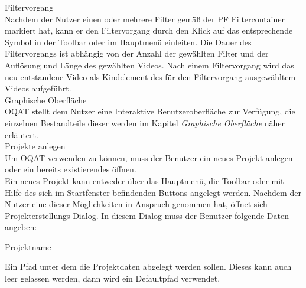  Filtervorgang\\
Nachdem der Nutzer einen oder mehrere Filter gemäß der PF Filtercontainer markiert hat, kann er
den Filtervorgang durch den Klick auf das entsprechende Symbol in der Toolbar oder im Hauptmenü
einleiten. Die Dauer des Filtervorgangs ist abhängig von der Anzahl der gewählten Filter und der Auflösung
und Länge des gewählten Videos. Nach einem Filtervorgang wird das neu entstandene Video
als Kindelement des für den Filtervorgang ausgewähltem Videos aufgeführt.\\
 Graphische Oberfläche \\
\gls{OQAT} stellt dem Nutzer eine Interaktive Benutzeroberfläche zur Verfügung, die
einzelnen Bestandteile dieser werden im Kapitel \emph{Graphische Oberfläche} näher erläutert.\\
 Projekte anlegen \\
Um \gls{OQAT} verwenden zu können, muss der Benutzer ein neues Projekt anlegen oder
ein bereits existierendes öffnen. \\
Ein neues Projekt kann entweder über das Hauptmenü, die Toolbar oder mit Hilfe des sich
im Startfenster befindenden Buttons angelegt werden. Nachdem der Nutzer eine dieser Möglichkeiten
in Anspruch genommen hat, öffnet sich Projekterstellungs-Dialog. In diesem Dialog
muss der Benutzer folgende Daten angeben:
\begin{compactitem}
\item Projektname
\item Ein Pfad unter dem die Projektdaten abgelegt werden sollen. Dieses kann auch leer gelassen werden, 
dann wird ein Defaultpfad verwendet.
\end{compactitem}

